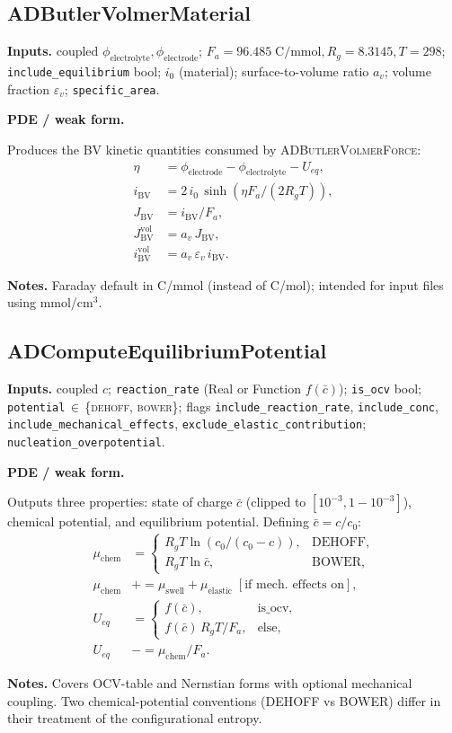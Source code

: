 \documentclass[11pt]{article}
\newcommand{\F}{F_{\!a}}            %
\newcommand{\Rg}{R_{\!g}}           %
\newcommand{\eps}{\varepsilon}
\newenvironment{ecmEntry}[1]{%
  \subsection{#1}%
}{}
\newcommand{\inputsRow}[1]{\par\noindent\textbf{Inputs.} #1\par}
\newcommand{\pdeRow}[1]{\par\noindent\textbf{PDE / weak form.}\par #1\par}
\newcommand{\notesRow}[1]{\par\noindent\textbf{Notes.} #1\par}
\begin{document}
\begin{ecmEntry}{ADButlerVolmerMaterial}
\label{bv-mat}
\inputsRow{coupled $\phi_{\text{electrolyte}},\phi_{\text{electrode}}$;
$\F=96.485\;\mathrm{C/mmol},\Rg=8.3145,T=298$; \texttt{include\_equilibrium} bool;
$i_0$ (material); surface-to-volume ratio $a_v$; volume fraction $\eps_v$; \texttt{specific\_area}.}
\pdeRow{Produces the BV kinetic quantities consumed by \textsc{ADButlerVolmerForce}:
\[
\begin{aligned}
\eta &= \phi_{\text{electrode}} - \phi_{\text{electrolyte}} - U_{eq},\\
i_{\text{BV}} &= 2\,i_0\,\sinh(\eta\F/(2\Rg T)),\\
J_{\text{BV}} &= i_{\text{BV}}/\F,\\
J_{\text{BV}}^{\text{vol}} &= a_v\,J_{\text{BV}},\\
i_{\text{BV}}^{\text{vol}} &= a_v\,\eps_v\,i_{\text{BV}}.
\end{aligned}
\]}
\notesRow{Faraday default in C/mmol (instead of C/mol); intended for input files using mmol/cm$^3$.}
\end{ecmEntry}

\begin{ecmEntry}{ADComputeEquilibriumPotential}
\inputsRow{coupled $c$; \texttt{reaction\_rate} (Real or Function $f(\bar c)$);
\texttt{is\_ocv} bool; \texttt{potential}\,$\in$\,\{\textsc{dehoff}, \textsc{bower}\};
flags \texttt{include\_reaction\_rate}, \texttt{include\_conc},
\texttt{include\_mechanical\_effects},
\texttt{exclude\_elastic\_contribution}; \texttt{nucleation\_overpotential}.}
\pdeRow{Outputs three properties: state of charge $\bar c$ (clipped to $[10^{-3},1-10^{-3}]$),
chemical potential, and equilibrium potential. Defining $\bar c = c/c_0$:
\[
\begin{aligned}
\mu_{\text{chem}} &= \begin{cases}
   \Rg T \ln(c_0/(c_0-c)), & \text{DEHOFF},\\
   \Rg T \ln \bar c,        & \text{BOWER},
 \end{cases}\\[4pt]
\mu_{\text{chem}} &\mathrel{+}= \mu_{\text{swell}} + \mu_{\text{elastic}}\;
    [\text{if mech. effects on}],\\[2pt]
U_{eq} &= \begin{cases}f(\bar c),& \text{is\_ocv},\\ f(\bar c)\,\Rg T/\F,& \text{else,}\end{cases}\\
U_{eq} &\mathrel{-}= \mu_{\text{chem}}/\F.
\end{aligned}
\]}
\notesRow{Covers OCV-table and Nernstian forms with optional mechanical coupling. Two
chemical-potential conventions (DEHOFF vs BOWER) differ in their treatment of the
configurational entropy.}
\end{ecmEntry}
\end{document}
